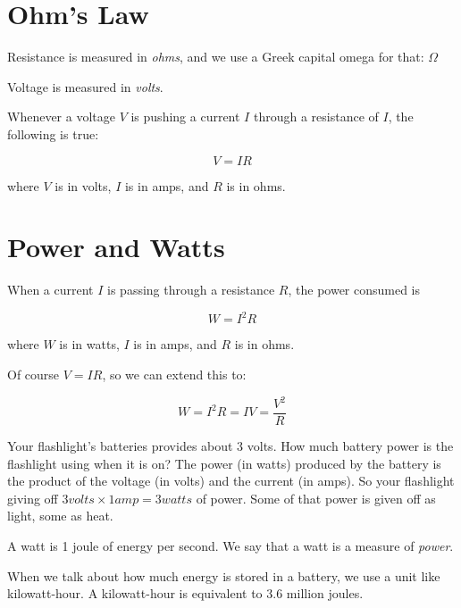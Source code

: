 \section{Ohm's Law}

Resistance is measured in \textit{ohms}, and we use a Greek capital omega for that: $\Omega$  

Voltage is measured in
\textit{volts}.

\begin{mdframed}[style=important, frametitle={Ohm's Law}]
  Whenever a voltage $V$ is pushing a current $I$ through a resistance of $I$, the following is true:

  $$V = IR$$

  where $V$ is in volts, $I$ is in amps, and $R$ is in ohms.
\end{mdframed}

\section{Power and Watts}

\begin{mdframed}[style=important, frametitle={Joule's Law}]

  When a current $I$ is passing through a resistance $R$, the power consumed is
  
  $$W = I^2 R$$

  where $W$ is in watts, $I$ is in amps, and $R$ is in ohms.
\end{mdframed}

Of course $V = IR$, so we can extend this to:

$$W = I^2 R = I V = \frac{V^2}{R}$$

Your flashlight's batteries provides about 3 volts. How much
battery power is the flashlight using when it is on? The power (in
watts) produced by the battery is the product of the voltage (in
volts) and the current (in amps). So your flashlight giving off $3
volts \times 1 amp = 3 watts$ of power. Some of that power is given
off as light, some as heat.

A watt is 1 joule of energy per second. We say that a watt is a
measure of \textit{power}.

When we talk about how much energy is stored in a battery, we use a
unit like kilowatt-hour. A kilowatt-hour is equivalent to 3.6 million
joules.

